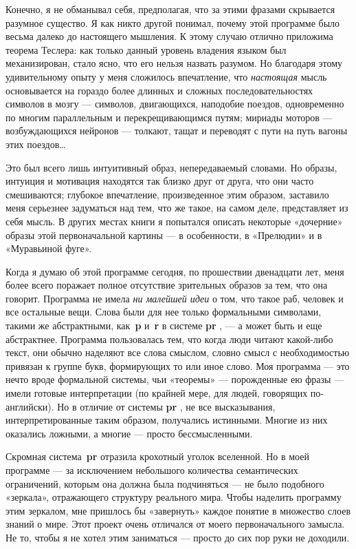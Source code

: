 Конечно, я не обманывал себя, предполагая, что за этими фразами скрывается разумное существо. Я как никто другой понимал, почему этой программе было весьма далеко до настоящего мышления. К этому случаю отлично приложима теорема Теслера: как только данный уровень владения языком был механизирован, стало ясно, что его нельзя назвать разумом. Но благодаря этому удивительному опыту у меня сложилось впечатление, что \emph{настоящая} мысль основывается на гораздо более длинных и сложных последовательностях символов в мозгу --- символов, двигающихся, наподобие поездов, одновременно по многим параллельным и перекрещивающимся путям; мириады моторов --- возбуждающихся нейронов --- толкают, тащат и переводят с пути на путь вагоны этих поездов\ldots{}

Это был всего лишь интуитивный образ, непередаваемый словами. Но образы, интуиция и мотивация находятся так близко друг от друга, что они часто смешиваются; глубокое впечатление, произведенное этим образом, заставило меня серьезнее задуматься над тем, что же такое, на самом деле, представляет из себя мысль. В других местах книги я попытался описать некоторые «дочерние» образы этой первоначальной картины --- в особенности, в «Прелюдии» и в «Муравьиной фуге».

Когда я думаю об этой программе сегодня, по прошествии двенадцати лет, меня более всего поражает полное отсутствие зрительных образов за тем, что она говорит. Программа не имела \emph{ни малейшей идеи} о том, что такое раб, человек и все остальные вещи. Слова были для нее только формальными символами, такими же абстрактными, как~\textbf{p} и~\textbf{r} в системе \textbf{pr} , --- а может быть и еще абстрактнее. Программа пользовалась тем, что когда люди читают какой-либо текст, они обычно наделяют все слова смыслом, словно смысл с необходимостью привязан к группе букв, формирующих то или иное слово. Моя программа --- это нечто вроде формальной системы, чьи «теоремы» --- порожденные ею фразы --- имели готовые интерпретации (по крайней мере, для людей, говорящих по-английски). Но в отличие от системы \textbf{pr} , не все высказывания, интерпретированные таким образом, получались истинными. Многие из них оказались ложными, а многие --- просто бессмысленными.

Скромная система~\textbf{pr} отразила крохотный уголок вселенной. Но в моей программе --- за исключением небольшого количества семантических ограничений, которым она должна была подчиняться --- не было подобного «зеркала», отражающего структуру реального мира. Чтобы наделить программу этим зеркалом, мне пришлось бы «завернуть» каждое понятие в множество слоев знаний о мире. Этот проект очень отличался от моего первоначального замысла. Не то, чтобы я не хотел этим заниматься --- просто до сих пор руки не доходили.

